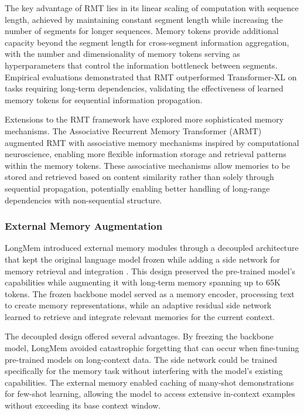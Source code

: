 \documentclass[11pt,letterpaper]{article}
\begin{document}
The key advantage of RMT lies in its linear scaling of computation with sequence length, achieved by maintaining constant segment length while increasing the number of segments for longer sequences. Memory tokens provide additional capacity beyond the segment length for cross-segment information aggregation, with the number and dimensionality of memory tokens serving as hyperparameters that control the information bottleneck between segments. Empirical evaluations demonstrated that RMT outperformed Transformer-XL on tasks requiring long-term dependencies, validating the effectiveness of learned memory tokens for sequential information propagation.

Extensions to the RMT framework have explored more sophisticated memory mechanisms. The Associative Recurrent Memory Transformer (ARMT) augmented RMT with associative memory mechanisms inspired by computational neuroscience, enabling more flexible information storage and retrieval patterns within the memory tokens. These associative mechanisms allow memories to be stored and retrieved based on content similarity rather than solely through sequential propagation, potentially enabling better handling of long-range dependencies with non-sequential structure.

\subsubsection{External Memory Augmentation}

LongMem introduced external memory modules through a decoupled architecture that kept the original language model frozen while adding a side network for memory retrieval and integration \cite{wang2023augmenting}. This design preserved the pre-trained model's capabilities while augmenting it with long-term memory spanning up to 65K tokens. The frozen backbone model served as a memory encoder, processing text to create memory representations, while an adaptive residual side network learned to retrieve and integrate relevant memories for the current context.

The decoupled design offered several advantages. By freezing the backbone model, LongMem avoided catastrophic forgetting that can occur when fine-tuning pre-trained models on long-context data. The side network could be trained specifically for the memory task without interfering with the model's existing capabilities. The external memory enabled caching of many-shot demonstrations for few-shot learning, allowing the model to access extensive in-context examples without exceeding its base context window.
\end{document}

